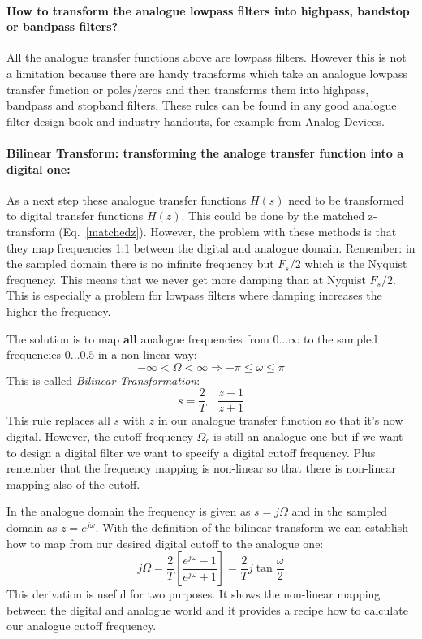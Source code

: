 \documentclass[12pt,a4paper]{article}
\begin{document}
\paragraph{How to transform the analogue lowpass filters into
  highpass, bandstop or bandpass filters?}
All the analogue transfer functions above are lowpass
filters. However this is not a limitation because there are handy transforms
which take an analogue lowpass transfer function or poles/zeros
and then transforms them into highpass, bandpass and stopband
filters. These rules can be found in any good analogue filter
design book and industry handouts, for example from Analog Devices.

\paragraph{Bilinear Transform: transforming the analoge transfer function into a digital one:}
As a next step these analogue transfer functions $H(s)$ need to be
transformed to digital transfer functions $H(z)$. This could be done
by the matched z-transform
(Eq.~\ref{matchedz}). However, the problem with these methods is that
they map frequencies 1:1 between the digital and analogue
domain. Remember: in the sampled domain there is no infinite frequency
but $F_s/2$ which is the Nyquist frequency.  This means that we never
get more damping than at Nyquist $F_s/2$.  This is especially a
problem for lowpass filters where damping increases the higher the
frequency.

The solution is to map {\bf all} analogue frequencies from $0 \ldots \infty$
to the sampled frequencies $0\ldots 0.5$ in a non-linear way:
\begin{equation} 
- \infty < \Omega < \infty \Rightarrow -\pi \leq \omega \leq \pi 
\end{equation}
This is called \textsl{Bilinear Transformation}:
\begin{equation} 
s = \frac{2}{T} \quad \frac{z - 1}{z + 1}
\end{equation}
This rule replaces all $s$ with $z$ in our analogue transfer
function so that it's now digital. However, the cutoff frequency $\Omega_c$
is still an analogue one but if we want to design a digital filter
we want to specify a digital cutoff frequency. Plus remember that
the frequency mapping is non-linear so that there is non-linear
mapping also of the cutoff. 

In the analogue domain the
frequency is given as $s = j\Omega$ and in the sampled domain as
$z = e^{j \omega}$. With the definition of the bilinear transform
we can establish how to map from our desired digital cutoff to
the analogue one:
\begin{equation} 
j \Omega = \frac{2}{T} \left[\frac{e^{j \omega} - 1}{e^{j \omega} +1}\right] = \frac{2}{T} j \tan \frac{\omega}{2}
\end{equation}
This derivation is useful for two purposes. It shows the non-linear
mapping between the digital and analogue world and it provides
a recipe how to calculate our analogue cutoff frequency.
\end{document}

